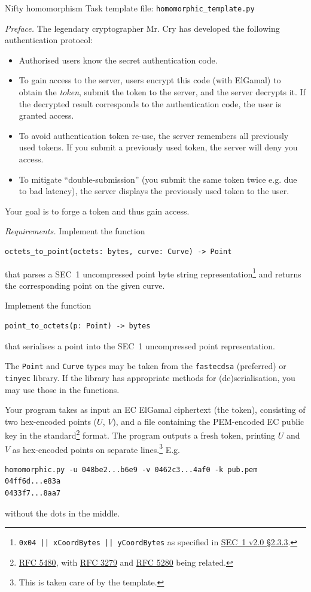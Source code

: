\documentclass{homework}
\begin{document}
\begin{task}{Nifty homomorphism}
  Task template file: \texttt{homomorphic\_template.py}

  \textit{Preface.}
  The legendary cryptographer Mr. Cry has developed the following authentication protocol:
  \begin{itemize}
    \item Authorised users know the secret authentication code.
    \item To gain access to the server, users encrypt this code (with ElGamal) to obtain the \emph{token}, submit the token to the server, and the server decrypts it.
    If the decrypted result corresponds to the authentication code, the user is granted access.
    \item To avoid authentication token re-use, the server remembers all previously used tokens.
    If you submit a previously used token, the server will deny you access.
    \item To mitigate \enquote{double-submission} (you submit the same token twice e.g. due to bad latency), the server displays the previously used token to the user.
  \end{itemize}

  Your goal is to forge a token and thus gain access.

  \textit{Requirements.}
  Implement the function
  \begin{Verbatim}
octets_to_point(octets: bytes, curve: Curve) -> Point
  \end{Verbatim}
  that parses a SEC~1 uncompressed point byte string representation\footnote{\texttt{0x04 || xCoordBytes || yCoordBytes} as specified in \href{https://www.secg.org/sec1-v2.pdf\#subsubsection.2.3.3}{SEC~1 v2.0 \S 2.3.3}.} and returns the corresponding point on the given curve.

  Implement the function
  \begin{Verbatim}
point_to_octets(p: Point) -> bytes
  \end{Verbatim}
  that serialises a point into the SEC~1 uncompressed point representation.

  The \texttt{Point} and \texttt{Curve} types may be taken from the \texttt{fastecdsa} (preferred) or \texttt{tinyec} library.
  If the library has appropriate methods for (de)serialisation, you may use those in the functions.

  Your program takes as input an EC ElGamal ciphertext (the token), consisting of two hex-encoded points ($U$, $V$), and a file containing the PEM-encoded EC public key in the standard\footnote{\href{https://datatracker.ietf.org/doc/html/rfc5480}{RFC 5480}, with \href{https://datatracker.ietf.org/doc/html/rfc3279}{RFC 3279} and \href{https://datatracker.ietf.org/doc/html/rfc5280\#section-4.1.2.7}{RFC 5280} being related.} format.
  The program outputs a fresh token, printing $U$ and $V$ as hex-encoded points on separate lines.\footnote{This is taken care of by the template.}
  E.g.
  \begin{Verbatim}
homomorphic.py -u 048be2...b6e9 -v 0462c3...4af0 -k pub.pem
04ff6d...e83a
0433f7...8aa7
  \end{Verbatim}
  without the dots in the middle.


\end{task}
\end{document}
